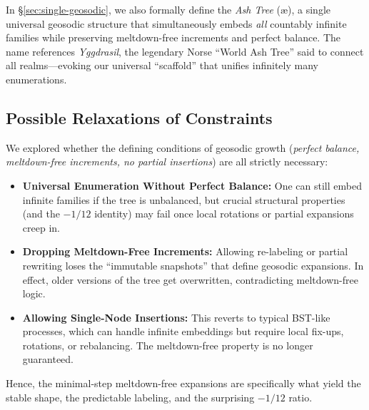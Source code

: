 \documentclass[11pt]{article}
\theoremstyle{definition}
\theoremstyle{remark}
\begin{document}
In \S\ref{sec:single-geosodic}, we also formally define the \emph{Ash Tree} (\ae),
a single universal geosodic structure that simultaneously embeds
\emph{all} countably infinite families while preserving meltdown-free increments
and perfect balance.  The name references \emph{Yggdrasil}, the legendary Norse
“World Ash Tree” said to connect all realms—evoking our universal “scaffold”
that unifies infinitely many enumerations.

\subsection*{Possible Relaxations of Constraints}
We explored whether the defining conditions of geosodic growth
(\emph{perfect balance, meltdown-free increments, no partial insertions})
are all strictly necessary:

\begin{itemize}
  \item \textbf{Universal Enumeration Without Perfect Balance:}
    One can still embed infinite families if the tree is unbalanced,
    but crucial structural properties (and the $-1/12$ identity)
    may fail once local rotations or partial expansions creep in.
  \item \textbf{Dropping Meltdown-Free Increments:}
    Allowing re-labeling or partial rewriting loses the “immutable
    snapshots” that define geosodic expansions. In effect, older versions
    of the tree get overwritten, contradicting meltdown-free logic.
  \item \textbf{Allowing Single-Node Insertions:}
    This reverts to typical BST-like processes, which can handle infinite
    embeddings but require local fix-ups, rotations, or rebalancing. 
    The meltdown-free property is no longer guaranteed.
\end{itemize}

Hence, the minimal-step meltdown-free expansions are specifically what yield
the stable shape, the predictable labeling, and the surprising $-1/12$ ratio.
\end{document}
